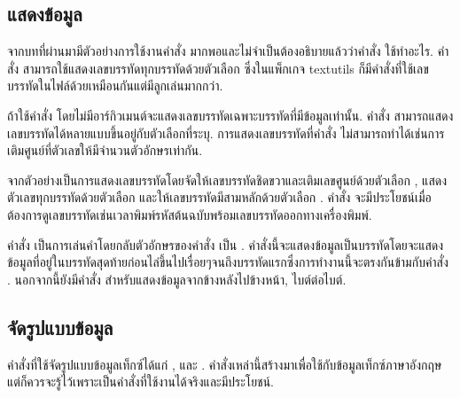 \begin{thwbr}
\subsection{แสดงข้อมูล}
\begin{figure}[!htb]
\end{figure}

จากบทที่ผ่านมามีตัวอย่างการใช้งานคำสั่ง  มากพอและไม่จำเป็นต้องอธิบายแล้วว่าคำสั่ง  ใช้ทำอะไร. คำสั่ง  สามารถใช้แสดงเลขบรรทัดทุกบรรทัดด้วยตัวเลือก  ซึ่งในแพ็กเกจ textutils ก็มีคำสั่งที่ใช้เลขบรรทัดในไฟล์ด้วยเหมือนกันแต่มีลูกเล่นมากกว่า.

ถ้าใช้คำสั่ง  โดยไม่มีอาร์กิวเมนต์จะแสดงเลขบรรทัดเฉพาะบรรทัดที่มีข้อมูลเท่านั้น. คำสั่ง  สามารถแสดงเลขบรรทัดได้หลายแบบขึ้นอยู่กับตัวเลือกที่ระบุ. การแสดงเลขบรรทัดที่คำสั่ง  ไม่สามารถทำได้เช่นการเติมศูนย์ที่ตัวเลขให้มีจำนวนตัวอักษรเท่ากัน.

\begin{MyExample}
\end{MyExample}%

จากตัวอย่างเป็นการแสดงเลขบรรทัดโดยจัดให้เลขบรรทัดชิดขวาและเติมเลขศูนย์ด้วยตัวเลือก , แสดงตัวเลขทุกบรรทัดด้วยตัวเลือก  และให้เลขบรรทัดมีสามหลักด้วยตัวเลือก . คำสั่ง  จะมีประโยชน์เมื่อต้องการดูเลขบรรทัดเช่นเวลาพิมพ์รหัสต้นฉบับพร้อมเลขบรรทัดออกทางเครื่องพิมพ์.

\medskip
คำสั่ง  เป็นการเล่นคำโดยกลับตัวอักษรของคำสั่ง  เป็น . คำสั่งนี้จะแสดงข้อมูลเป็นบรรทัดโดยจะแสดงข้อมูลที่อยู่ในบรรทัดสุดท้ายก่อนไล่ขึ้นไปเรื่อยๆจนถึงบรรทัดแรกซึ่งการทำงานนี้จะตรงกันข้ามกับคำสั่ง . นอกจากนี้ยังมีคำสั่ง  สำหรับแสดงข้อมูลจากข้างหลังไปข้างหน้า, ไบต์ต่อไบต์.

\subsection{จัดรูปแบบข้อมูล}
คำสั่งที่ใช้จัดรูปแบบข้อมูลเท็กซ์ได้แก่ ,  และ . คำสั่งเหล่านี้สร้างมาเพื่อใช้กับข้อมูลเท็กซ์ภาษาอังกฤษแต่ก็ควรจะรู้ไว้เพราะเป็นคำสั่งที่ใช้งานได้จริงและมีประโยชน์. 


\end{thwbr}

